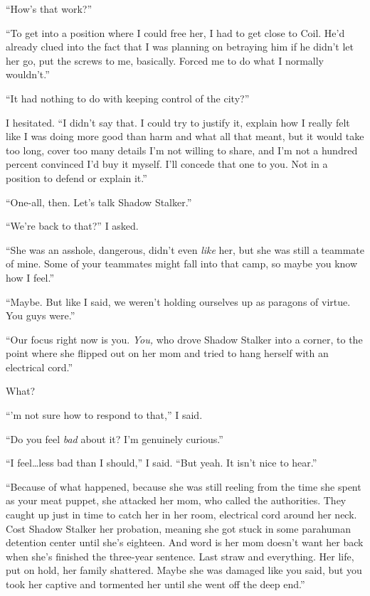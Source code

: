 ``How's that work?''



``To get into a position where I could free her, I had to get close to Coil.  He'd already clued into the fact that I was planning on betraying him if he didn't let her go, put the screws to me, basically.  Forced me to do what I normally wouldn't.''



``It had nothing to do with keeping control of the city?''



I hesitated.  ``I didn't say that.  I could try to justify it, explain how I really felt like I was doing more good than harm and what all that meant, but it would take too long, cover too many details I'm not willing to share, and I'm not a hundred percent convinced I'd buy it myself.  I'll concede that one to you.  Not in a position to defend or explain it.''



``One-all, then.  Let's talk Shadow Stalker.''



``We're back to that?''  I asked.



``She was an asshole, dangerous, didn't even \emph{like} her, but she was still a teammate of mine.  Some of your teammates might fall into that camp, so maybe you know how I feel.''



``Maybe.  But like I said, we weren't holding ourselves up as paragons of virtue.  You guys were.''



``Our focus right now is you.  \emph{You, }who drove Shadow Stalker into a corner, to the point where she flipped out on her mom and tried to hang herself with an electrical cord.''



What?



``\ldotsI'm not sure how to respond to that,'' I said.



``Do you feel \emph{bad} about it?  I'm genuinely curious.''



``I feel\ldots less bad than I should,'' I said.  ``But yeah.  It isn't nice to hear.''



``Because of what happened, because she was still reeling from the time she spent as your meat puppet, she attacked her mom, who called the authorities.  They caught up just in time to catch her in her room, electrical cord around her neck.  Cost Shadow Stalker her probation, meaning she got stuck in some parahuman detention center until she's eighteen.  And word is her mom doesn't want her back when she's finished the three-year sentence.  Last straw and everything.  Her life, put on hold, her family shattered.  Maybe she was damaged like you said, but you took her captive and tormented her until she went off the deep end.''



